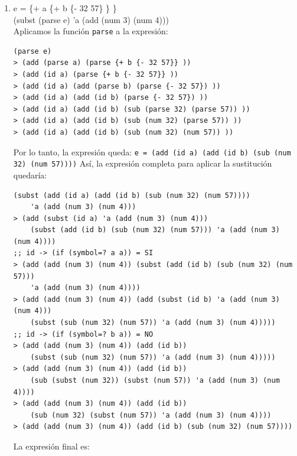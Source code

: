 \documentclass[11pt]{article}
\begin{document}
\begin{enumerate}[leftmargin=0.8cm]
\begin{enumerate}
\begin{lstlisting}
    {sub (num 30) {add (id y) (id z)}})
> (with (y (sub (num 30) (sub (subst (id y) 'y (id 'w))
    (subst (id z) 'y (id 'w)))))
    {sub (num 30) {add (id y) (id z)}})
;; id -> (if (symbol=? y y)) = SI
> (with (y (sub (num 30) (sub (id w) (subst (id z) 'y (id 'w)))))
    {sub (num 30) {add (id y) (id z)}})
;; id -> (if (symbol=? z y)) = NO
> (with (y (sub (num 30) (sub (id w) (id z))))
    (sub (num 30) (add (id y) (id z))))
        \end{lstlisting}
        La expresión final es:\\

        \item[b.] e = \{+ a \{+ b \{- 32 57\} \} \}\\
        (subst (parse e) 'a (add (num 3) (num 4)))\\
        Aplicamos la función \texttt{parse} a la expresión:
        \begin{lstlisting}
(parse e)
> (add (parse a) (parse {+ b {- 32 57}} ))
> (add (id a) (parse {+ b {- 32 57}} ))
> (add (id a) (add (parse b) (parse {- 32 57}) ))
> (add (id a) (add (id b) (parse {- 32 57}) ))
> (add (id a) (add (id b) (sub (parse 32) (parse 57)) ))
> (add (id a) (add (id b) (sub (num 32) (parse 57)) ))
> (add (id a) (add (id b) (sub (num 32) (num 57)) ))
        \end{lstlisting}
        Por lo tanto, la expresión queda:
        \texttt{e = (add (id a) (add (id b) (sub (num 32) (num 57))))}
        Así, la expresión completa para aplicar la sustitución quedaría:
        \begin{lstlisting}
(subst (add (id a) (add (id b) (sub (num 32) (num 57))))
    'a (add (num 3) (num 4)))
> (add (subst (id a) 'a (add (num 3) (num 4)))
    (subst (add (id b) (sub (num 32) (num 57))) 'a (add (num 3) (num 4))))
;; id -> (if (symbol=? a a)) = SI
> (add (add (num 3) (num 4)) (subst (add (id b) (sub (num 32) (num 57)))
    'a (add (num 3) (num 4))))
> (add (add (num 3) (num 4)) (add (subst (id b) 'a (add (num 3) (num 4)))
    (subst (sub (num 32) (num 57)) 'a (add (num 3) (num 4)))))
;; id -> (if (symbol=? b a)) = NO
> (add (add (num 3) (num 4)) (add (id b))
    (subst (sub (num 32) (num 57)) 'a (add (num 3) (num 4)))))
> (add (add (num 3) (num 4)) (add (id b))
    (sub (subst (num 32)) (subst (num 57)) 'a (add (num 3) (num 4))))
> (add (add (num 3) (num 4)) (add (id b))
    (sub (num 32) (subst (num 57)) 'a (add (num 3) (num 4))))
> (add (add (num 3) (num 4)) (add (id b) (sub (num 32) (num 57))))
        \end{lstlisting}
        La expresión final es:\\
    \end{enumerate}


\end{enumerate}
\end{document}
